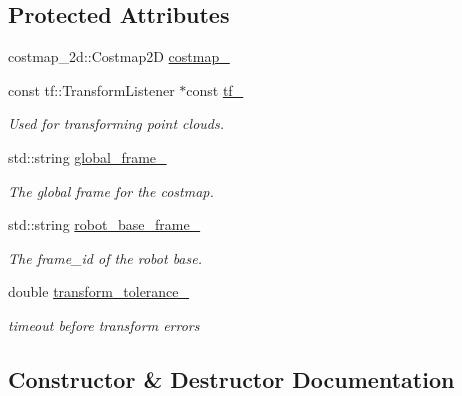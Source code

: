 \subsection*{Protected Attributes}
\begin{DoxyCompactItemize}
\item 
costmap\+\_\+2d\+::\+Costmap2D \hyperlink{classexplore_1_1Costmap2DClient_afdd7c04f99ea98d0f5f624a3446187c9}{costmap\+\_\+}
\item 
const tf\+::\+Transform\+Listener $\ast$const \hyperlink{classexplore_1_1Costmap2DClient_a1b47f263b4090e67878f388c19007759}{tf\+\_\+}
\begin{DoxyCompactList}\small\item\em Used for transforming point clouds. \end{DoxyCompactList}\item 
std\+::string \hyperlink{classexplore_1_1Costmap2DClient_a7a1947e93767e79127bf7579906aea00}{global\+\_\+frame\+\_\+}
\begin{DoxyCompactList}\small\item\em The global frame for the costmap. \end{DoxyCompactList}\item 
std\+::string \hyperlink{classexplore_1_1Costmap2DClient_aca46101d77483604e1bf30c705c42c28}{robot\+\_\+base\+\_\+frame\+\_\+}
\begin{DoxyCompactList}\small\item\em The frame\+\_\+id of the robot base. \end{DoxyCompactList}\item 
double \hyperlink{classexplore_1_1Costmap2DClient_a8df618a02b5a81b30e121cf509c0b804}{transform\+\_\+tolerance\+\_\+}
\begin{DoxyCompactList}\small\item\em timeout before transform errors \end{DoxyCompactList}\end{DoxyCompactItemize}


\subsection{Constructor \& Destructor Documentation}
